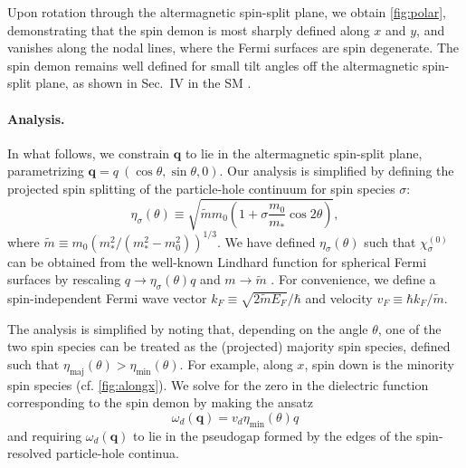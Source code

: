 \documentclass[aps,prl,reprint,twocolumns,superscriptaddress]{revtex4-2}
\newcommand{\mdos}{\tilde{m}}
\newcommand{\kF}{k_{F}}
\newcommand{\vs}{v_d}
\newcommand{\subfigref}[2]{Fig.~\hyperref[#1]{\ref*{#1}#2}}
\begin{document}
	
	Upon rotation through the altermagnetic spin-split plane, we obtain \cref{fig:polar}, demonstrating that the spin demon is most sharply defined along $x$ and $y$, and vanishes along the nodal lines, where the Fermi surfaces are spin degenerate. 
	The spin demon remains well defined for small tilt angles off the altermagnetic spin-split plane, as shown in Sec.~IV in the SM \cite{Note1}.
	
	
	
	
	\paragraph{Analysis. }
	In what follows, we constrain $\bm q$ to lie in the altermagnetic spin-split plane, parametrizing $\bm q = q\  (\cos\theta,\sin\theta,0)$. Our analysis is simplified by defining the projected spin splitting of the particle-hole continuum for spin species $\sigma$:
	\begin{equation}
		\eta_{\sigma}(\theta) \equiv \sqrt{\mdos m_0\left( 1+\sigma \frac{m_0}{m_*}\cos2\theta\right)} \label{eq:sigma},
	\end{equation}
	where $\mdos\equiv m_0({m_*^2}/({m_*^2-m_0^2}))^{1/3}$.
	We have defined $\eta_{\sigma}(\theta)$ such that $\chi^{(0)}_\sigma$ can be obtained from the well-known Lindhard function for spherical Fermi surfaces \cite{lindhardPropertiesGasCharged1954,giulianiQuantumTheoryElectron2005} by rescaling $q\rightarrow\eta_\sigma(\theta) q$ and $m\rightarrow \mdos$ \cite{ahnAnisotropicFermionicQuasiparticles2021}. For convenience, we define a spin-independent Fermi wave vector $\kF\equiv\sqrt{2\mdos E_F}/\hbar$ and velocity $v_F\equiv \hbar k_F/\mdos$.
	
	The analysis is simplified by noting that, depending on the angle $\theta$, one of the two spin species can be treated as the (projected) majority spin species, defined such that $\eta_{{\mathrm{maj}}}(\theta)>\eta_{{\mathrm{min}}}(\theta)$. For example, along $x$, spin down is the minority spin species (cf. \cref{fig:alongx}).
	We solve for the zero in the dielectric function corresponding to the spin demon by making the ansatz \cite{santoroAcousticPlasmonsConducting1988}
	\begin{equation}
		\omega_{d}(\bm q)=\vs \eta_{{\mathrm{min}}}(\theta)q
	\end{equation}
	and requiring $\omega_{d}(\bm q)$ to lie in the pseudogap formed by the edges of the spin-resolved particle-hole continua.
	
\end{document}
